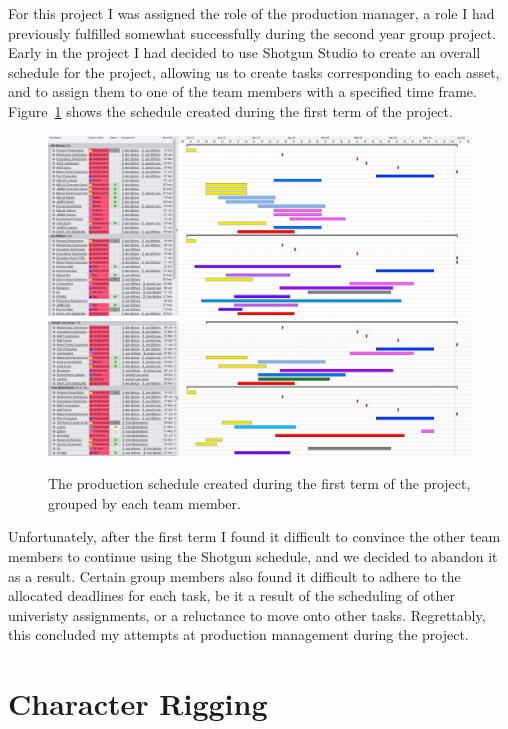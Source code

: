 \documentclass[11pt]{article}
\begin{document}
For this project I was assigned the role of the production manager, a role I had previously fulfilled somewhat successfully during the second year group project. Early in the project I had decided to use Shotgun Studio to create an overall schedule for the project, allowing us to create tasks corresponding to each asset, and to assign them to one of the team members with a specified time frame. Figure~\ref{figure:schedule} shows the schedule created during the first term of the project.

\begin{figure}[htbp]
\centering
\includegraphics[width=1.0\linewidth]{images/schedule01.png}
\includegraphics[width=1.0\linewidth]{images/schedule02.png}
\caption{\label{figure:schedule} The production schedule created during the first term of the project, grouped by each team member.}
\end{figure}

Unfortunately, after the first term I found it difficult to convince the other team members to continue using the Shotgun schedule, and we decided to abandon it as a result. Certain group members also found it difficult to adhere to the allocated deadlines for each task, be it a result of the scheduling of other univeristy assignments, or a reluctance to move onto other tasks. Regrettably, this concluded my attempts at production management during the project.

\section{Character Rigging}
\end{document}
